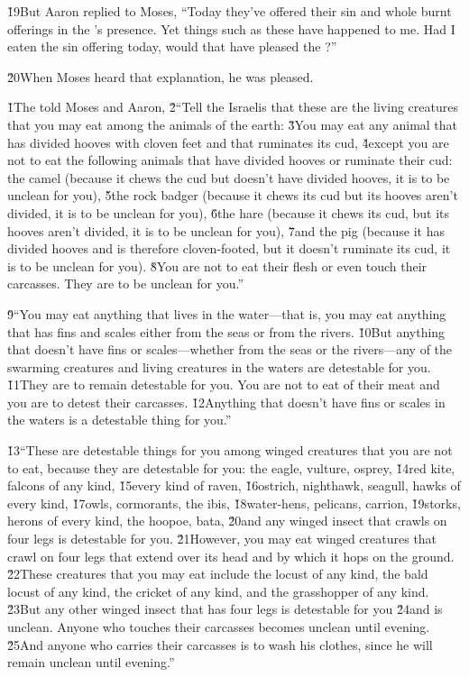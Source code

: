 \v{19}But Aaron replied to Moses, ``Today they've offered their sin and whole burnt offerings in the 's presence. Yet things such as these have happened to me. Had I eaten the sin offering today, would that have pleased the ?''

\v{20}When Moses heard that explanation, he was pleased.

\v{1}The  told Moses and Aaron, \v{2}``Tell the Israelis that these are the living creatures that you may eat among the animals of the earth: \v{3}You may eat any animal that has divided hooves with cloven feet and that ruminates its cud, \v{4}except you are not to eat the following animals that have divided hooves or ruminate their cud: the camel (because it chews the cud but doesn't have divided hooves, it is to be unclean for you), \v{5}the rock badger (because it chews its cud but its hooves aren't divided, it is to be unclean for you), \v{6}the hare (because it chews its cud, but its hooves aren't divided, it is to be unclean for you), \v{7}and the pig (because it has divided hooves and is therefore cloven-footed, but it doesn't ruminate its cud, it is to be unclean for you). \v{8}You are not to eat their flesh or even touch their carcasses. They are to be unclean for you.''

\v{9}``You may eat anything that lives in the water---that is, you may eat anything that has fins and scales either from the seas or from the rivers. \v{10}But anything that doesn't have fins or scales---whether from the seas or the rivers---any of the swarming creatures and living creatures in the waters are detestable for you. \v{11}They are to remain detestable for you. You are not to eat of their meat and you are to detest their carcasses. \v{12}Anything that doesn't have fins or scales in the waters is a detestable thing for you.''

\v{13}``These are detestable things for you among winged creatures that you are not to eat, because they are detestable for you: the eagle, vulture, osprey, \v{14}red kite, falcons of any kind, \v{15}every kind of raven, \v{16}ostrich, nighthawk, seagull, hawks of every kind, \v{17}owls, cormorants, the ibis, \v{18}water-hens, pelicans, carrion, \v{19}storks, herons of every kind, the hoopoe, bata, \v{20}and any winged insect that crawls on four legs is detestable for you. \v{21}However, you may eat winged creatures that crawl on four legs that extend over its head and by which it hops on the ground. \v{22}These creatures that you may eat include the locust of any kind, the bald locust of any kind, the cricket of any kind, and the grasshopper of any kind. \v{23}But any other winged insect that has four legs is detestable for you \v{24}and is unclean. Anyone who touches their carcasses becomes unclean until evening. \v{25}And anyone who carries their carcasses is to wash his clothes, since he will remain unclean until evening.''

